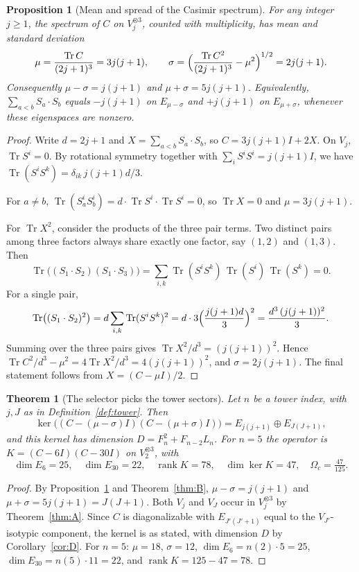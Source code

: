 \documentclass[11pt]{amsart}
\newtheorem{theorem}{Theorem}
\newtheorem{proposition}[lemma]{Proposition}
\theoremstyle{definition}
\theoremstyle{remark}
\newcommand{\rank}{\operatorname{rank}}
\newcommand{\Tr}{\operatorname{Tr}}
\begin{document}
\begin{proposition}[Mean and spread of the Casimir spectrum]\label{prop:musigma}
For any integer $j\ge 1$, the spectrum of $C$ on $V_j^{\otimes 3}$, counted with multiplicity, has mean and standard deviation
\[
\mu=\frac{\Tr C}{(2j+1)^3}=3j(j+1),\qquad\sigma=\Bigl(\frac{\Tr C^2}{(2j+1)^3}-\mu^2\Bigr)^{1/2}=2j(j+1).
\]
Consequently $\mu-\sigma=j(j+1)$ and $\mu+\sigma=5j(j+1)$. Equivalently, $\sum_{a<b}S_a\cdot S_b$ equals $-j(j+1)$ on $E_{\mu-\sigma}$ and $+j(j+1)$ on $E_{\mu+\sigma}$, whenever these eigenspaces are nonzero.
\end{proposition}
\begin{proof}
Write $d=2j+1$ and $X=\sum_{a<b}S_a\cdot S_b$, so $C=3j(j+1)I+2X$. On $V_j$, $\Tr S^i=0$. By rotational symmetry together with $\sum_iS^iS^i=j(j+1)I$, we have $\Tr(S^iS^k)=\delta_{ik}\,j(j+1)d/3$.

For $a\ne b$, $\Tr(S_a^iS_b^i)=d\cdot\Tr S^i\cdot\Tr S^i=0$, so $\Tr X=0$ and $\mu=3j(j+1)$.

For $\Tr X^2$, consider the products of the three pair terms. Two distinct pairs among three factors always share exactly one factor, say $(1,2)$ and $(1,3)$. Then
\[
\Tr\bigl((S_1\cdot S_2)(S_1\cdot S_3)\bigr)=\sum_{i,k}\Tr(S^iS^k)\,\Tr(S^i)\,\Tr(S^k)=0.
\]
For a single pair,
\[
\Tr\bigl((S_1\cdot S_2)^2\bigr)=d\sum_{i,k}\Tr(S^iS^k)^2=d\cdot3\Bigl(\frac{j(j+1)d}{3}\Bigr)^2=\frac{d^3\,(j(j+1))^2}{3}.
\]
Summing over the three pairs gives $\Tr X^2/d^3=(j(j+1))^2$. Hence $\Tr C^2/d^3-\mu^2=4\Tr X^2/d^3=4(j(j+1))^2$, and $\sigma=2j(j+1)$. The final statement follows from $X=(C-\mu I)/2$.
\end{proof}

\begin{theorem}[The selector picks the tower sectors]\label{thm:C}
Let $n$ be a tower index, with $j,J$ as in Definition~\ref{def:tower}. Then
\[
\ker\bigl((C-(\mu-\sigma)I)(C-(\mu+\sigma)I)\bigr)=E_{j(j+1)}\oplus E_{J(J+1)},
\]
and this kernel has dimension $D=F_n^2+F_{n-2}L_n$. For $n=5$ the operator is $K=(C-6I)(C-30I)$ on $V_2^{\otimes3}$, with
\[
\dim E_6=25,\quad\dim E_{30}=22,\quad\rank K=78,\quad\dim\ker K=47,\quad\Omega_c=\tfrac{47}{125}.
\]
\end{theorem}
\begin{proof}
By Proposition~\ref{prop:musigma} and Theorem~\ref{thm:B}, $\mu-\sigma=j(j+1)$ and $\mu+\sigma=5j(j+1)=J(J+1)$. Both $V_j$ and $V_J$ occur in $V_j^{\otimes3}$ by Theorem~\ref{thm:A}. Since $C$ is diagonalizable with $E_{J'(J'+1)}$ equal to the $V_{J'}$-isotypic component, the kernel is as stated, with dimension $D$ by Corollary~\ref{cor:D}. For $n=5$: $\mu=18$, $\sigma=12$, $\dim E_6=n(2)\cdot5=25$, $\dim E_{30}=n(5)\cdot11=22$, and $\rank K=125-47=78$.
\end{proof}
\end{document}
